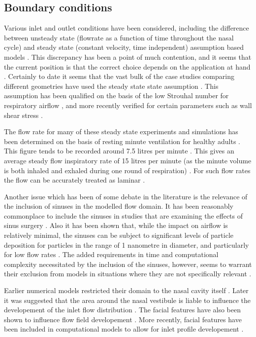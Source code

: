 \subsection*{Boundary conditions}
Various inlet and outlet conditions have been considered, including the difference between unsteady state  (flowrate as a function of time throughout the nasal cycle) \cite{Shi2006} and steady state (constant velocity, time independent) assumption based models \cite{Wen2008}. This discrepancy has been a point of much contention, and it seems that the current position is that the correct choice depends on the application at hand \cite{Doorly2008c}. Certainly to date it seems that the vast bulk of the case studies comparing different geometries have used the steady state state assumption \cite{Xi2012, Zhu2011, Garcia2007, Doorly2008c, Keyhani1995, Subramaniam1998, Wen2008}. This assumption has been qualified on the basis of the low Strouhal number for respiratory airflow \cite{Keyhani1995}, and more recently verified for certain parameters such as wall shear stress \cite{Doorly2008c}.


The flow rate for many of these steady state experiments and simulations has been determined on the basis of resting minute ventilation for healthy adults \cite{Subramaniam1998, Wen2008}. This figure tends to be recorded around 7.5 litres per minute \cite{Chaya2006, Tobin1983}. This gives an average steady flow inspiratory rate of 15 litres per minute (as the minute volume is both inhaled and exhaled during one round of respiration) \cite{Subramaniam1998}. For such flow rates the flow can be accurately treated as laminar \cite{Doorly2008c, Hahn1993}.


Another issue which has been of some debate in the literature is the relevance of the inclusion of sinuses in the modelled flow domain. It has been reasonably commonplace to include the sinuses in studies that are examining the effects of sinus surgery \cite{Xiong2008a, Lindemann2005}. Also it has been shown that, while the impact on airflow is relatively minimal, the sinuses can be subject to significant levels of particle deposition for particles in the range of 1 nanometre in diameter, and particularly for low flow rates \cite{Ge2012}. The added requirements in time and computational complexity necessitated by the inclusion of the sinuses, however, seems to warrant their exclusion from models in situations where they are not specifically relevant \cite{Doorly2008c}.


Earlier numerical models restricted their domain to the nasal cavity itself \cite{Keyhani1995, Subramaniam1998, Wen2008}. Later it was suggested that the area around the nasal vestibule is liable to influence the developement of the inlet flow distribution \cite{Doorly2008}. The facial features have also been shown to influence flow field developement \cite{Anthony2005}. More recently, facial features have been included in computational models to allow for inlet profile developement \cite{Li2012, Lee2010}.



